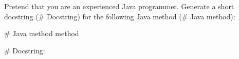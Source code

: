 Pretend that you are an experienced Java programmer. Generate a short docstring (# Docstring) for the following Java method (# Java method):

# Java method
{method}

# Docstring:
